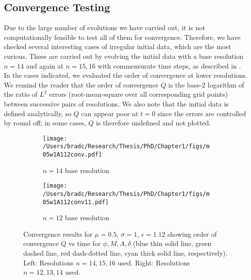 \documentclass[../PhD.tex]{subfiles}
\begin{document}
\begin{subappendices}
\section{Convergence Testing}
\label{a:convergence}

Due to the large number of evolutions we have carried out, it is not
computationally feasible to test all of them for convergence.  Therefore,
we have checked several interesting cases of irregular initial data, which 
are the most curious.  These are carried out by evolving the initial data
with a base resolution $n=14$ and again at $n=15,16$ with commensurate
time steps, as described in \cite{1508.02709}.  In the cases indicated, we
evaluated the order of convergence at lower resolutions.  We remind the
reader that the order of convergence $Q$ is the base-2 logarithm of the ratio
of $L^2$ errors (root-mean-square over all corresponding grid points) between
successive pairs of resolutions.  We also note that the initial data is 
defined analytically, so $Q$ can appear poor at $t=0$ since the errors are
controlled by round off; in some cases, $Q$ is therefore undefined and 
not plotted.

\begin{figure}[!t]
\centering
\begin{subfigure}[t]{0.47\textwidth}
\texttt{[image: /Users/bradc/Research/Thesis/PhD/Chapter1/figs/m05w1A112conv.pdf]}
\caption{$n=14$ base resolution}
\label{f:m05w1e112conv}
\end{subfigure}
\begin{subfigure}[t]{0.47\textwidth}
\texttt{[image: /Users/bradc/Research/Thesis/PhD/Chapter1/figs/m05w1A112conv11.pdf]}
\caption{$n=12$ base resolution}
\label{f:m05w1e112conv11}
\end{subfigure}
\caption[Comparison of order of convergence of $\phi$, $M$, $A$, $\delta$ as a function of time for $\mu = 0.5$ over two base resolutions]{Convergence results for $\mu=0.5$, $\sigma=1$, $\epsilon=1.12$
showing order of convergence $Q$ vs time for $\phi,M,A,\delta$ 
(blue thin solid line, green dashed line, red dash-dotted line, cyan thick solid line, respectively). Left: Resolutions $n=14,15,16$ used.
Right: Resolutions $n=12,13,14$ used.}
\label{f:m05w1convergence}
\end{figure}



\end{subappendices}
\end{document}
